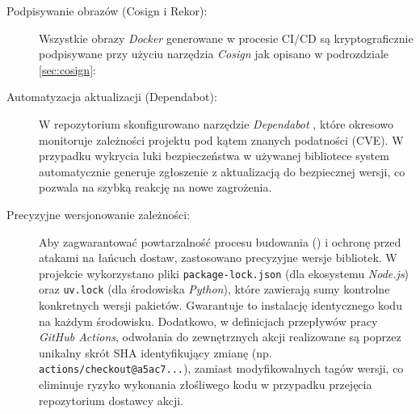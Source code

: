\begin{description}
	\item[Podpisywanie obrazów (Cosign i Rekor):] Wszystkie obrazy \textit{Docker} generowane w procesie CI/CD są kryptograficznie podpisywane przy użyciu narzędzia \textit{Cosign} jak opisano w podrozdziale \ref{sec:cosign}: 

	\item[Automatyzacja aktualizacji (Dependabot):] W repozytorium skonfigurowano narzędzie \textit{Dependabot} \cite{dependabot}, które okresowo monitoruje zależności projektu pod kątem znanych podatności (CVE). W przypadku wykrycia luki bezpieczeństwa w używanej bibliotece system automatycznie generuje zgłoszenie z aktualizacją do bezpiecznej wersji, co pozwala na szybką reakcję na nowe zagrożenia.

	\item[Precyzyjne wersjonowanie zależności:] Aby zagwarantować powtarzalność procesu budowania () i ochronę przed atakami na łańcuch dostaw, zastosowano precyzyjne wersje bibliotek. W projekcie wykorzystano pliki \texttt{package-lock.json} (dla ekosystemu \textit{Node.js}) oraz \texttt{uv.lock} (dla środowiska \textit{Python}), które zawierają sumy kontrolne konkretnych wersji pakietów. Gwarantuje to instalację identycznego kodu na każdym środowisku. Dodatkowo, w definicjach przepływów pracy \textit{GitHub Actions}, odwołania do zewnętrznych akcji realizowane są poprzez unikalny skrót SHA identyfikujący zmianę (np. \texttt{actions/checkout@a5ac7...}), zamiast modyfikowalnych tagów wersji, co eliminuje ryzyko wykonania złośliwego kodu w przypadku przejęcia repozytorium dostawcy akcji.
\end{description}


